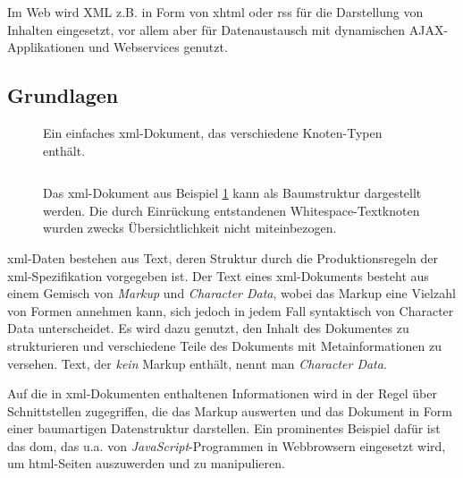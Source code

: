 Im Web wird XML z.B. in Form von \acrshort{xhtml} oder \gls{rss} für die Darstellung von Inhalten eingesetzt, vor allem aber für Datenaustausch mit dynamischen AJAX-Applikationen und Webservices genutzt.

\subsection{Grundlagen}
\label{sec:xmlbasics}

\begin{figure}[h!]
    \begin{example}
        Ein  einfaches \acrshort{xml}-Dokument, das verschiedene Knoten-Typen enthält.
        \label{ex:xmldoc}
        \inputminted{xml}{xmltree.xml}
        \end{example}
\end{figure}

\begin{figure}[b!]
    \begin{example}
        Das \acrshort{xml}-Dokument aus Beispiel \ref{ex:xmldoc} kann als Baumstruktur dargestellt werden. Die durch Einrückung entstandenen Whitespace-Textknoten wurden zwecks Übersichtlichkeit nicht miteinbezogen.
        \begin{center}
            
        \end{center}
        \label{ex:xmltree}
    \end{example}
\end{figure}

\acrshort{xml}-Daten bestehen aus Text, deren Struktur durch die Produktionsregeln der \acrshort{xml}-Spezifikation vorgegeben ist. Der Text eines \acrshort{xml}-Dokuments besteht aus einem Gemisch von \emph{Markup} und \emph{Character Data}, wobei das Markup eine Vielzahl von Formen annehmen kann, sich jedoch in jedem Fall syntaktisch von Character Data unterscheidet. Es wird dazu genutzt, den Inhalt des Dokumentes zu strukturieren und verschiedene Teile des Dokuments mit Metainformationen zu versehen. Text, der \emph{kein} Markup enthält, nennt man \emph{Character Data}.

Auf die in \acrshort{xml}-Dokumenten enthaltenen Informationen wird in der Regel über Schnittstellen zugegriffen, die das Markup auswerten und das Dokument in Form einer baumartigen Datenstruktur darstellen. Ein prominentes Beispiel dafür ist das \acrfull{dom}, das u.a. von \emph{JavaScript}-Programmen in Webbrowsern eingesetzt wird, um  \acrshort{html}-Seiten auszuwerden und zu manipulieren.

